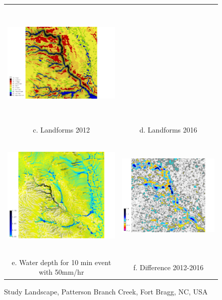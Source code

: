 \documentclass[final,3p,times,twocolumn]{elsarticle}
\begin{document}
\begin{figure}[h]
\begin{tabular}{m{} m{}}
\includegraphics[height=60mm,center]{../images/sample_data/gully_landforms_2016.png}\\
\multicolumn{1}{c}{c. Landforms 2012} & \multicolumn{1}{c}{d. Landforms 2016}\\
%
\multicolumn{1}{c}{\includegraphics[height=60mm]{../images/sample_data/depth_2016.png}} &
\multicolumn{1}{c}{\includegraphics[height=60mm]{../images/sample_data/gully_difference_2012_2016.png}}\\
\multicolumn{1}{c}{e. Water depth for 10 min event with 50mm/hr} & \multicolumn{1}{c}{f. Difference 2012-2016}\\
%
\end{tabular}
\caption{Study Landscape, Patterson Branch Creek, Fort Bragg, NC, USA}
\label{fig:study_area}
\end{figure}
\end{document}
